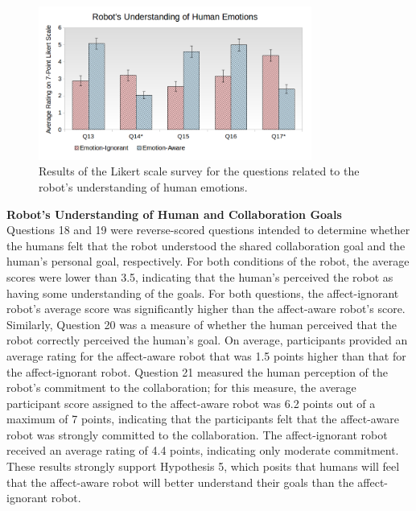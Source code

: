 \documentclass[12pt]{report}
\begin{document}
\begin{figure}[t]
\centering
\includegraphics[width=0.8\textwidth]{figure/Overall-Emotions.png}
\vspace*{-5mm}
\caption{Results of the Likert scale survey for the questions related to the
robot's understanding of human emotions.}
\label{fig:overall-emotions}
\end{figure}

\hspace*{-8mm} \textbf{Robot's Understanding of Human and Collaboration Goals}
\label{sec:Goals}
\\Questions 18 and 19 were reverse-scored questions intended to determine
whether the humans felt that the robot understood the shared collaboration goal
and the human's personal goal, respectively. For both conditions of the robot,
the average scores were lower than 3.5, indicating that the human's perceived
the robot as having some understanding of the goals. For both questions, the
affect-ignorant robot's average score was significantly higher than the
affect-aware robot's score. Similarly, Question 20 was a measure of whether the
human perceived that the robot correctly perceived the human's goal.
On average, participants provided an average rating for the affect-aware robot
that was 1.5 points higher than that for the affect-ignorant robot. Question 21
measured the human perception of the robot's commitment to the collaboration;
for this measure, the average participant score assigned to the affect-aware
robot was 6.2 points out of a maximum of 7 points, indicating that the
participants felt that the affect-aware robot was strongly committed to the
collaboration. The affect-ignorant robot received an average rating of 4.4
points, indicating only moderate commitment. These results strongly support
Hypothesis 5, which posits that humans will feel that the affect-aware robot
will better understand their goals than the affect-ignorant robot.\\
\end{document}
